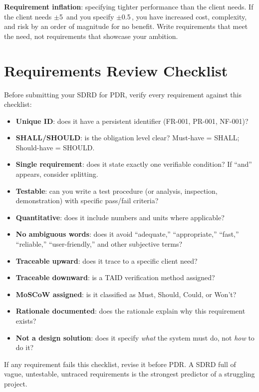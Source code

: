 \textbf{Requirement inflation}: specifying tighter performance than the client needs. If the client needs $\pm$5\,\degC{} and you specify $\pm$0.5\,\degC{}, you have increased cost, complexity, and risk by an order of magnitude for no benefit. Write requirements that meet the need, not requirements that showcase your ambition.

\section{Requirements Review Checklist}
Before submitting your SDRD for PDR, verify every requirement against this checklist:

\begin{itemize}[nosep,leftmargin=1.5em]
\item \textbf{Unique ID}: does it have a persistent identifier (FR-001, PR-001, NF-001)?
\item \textbf{SHALL/SHOULD}: is the obligation level clear? Must-have = SHALL; Should-have = SHOULD.
\item \textbf{Single requirement}: does it state exactly one verifiable condition? If ``and'' appears, consider splitting.
\item \textbf{Testable}: can you write a test procedure (or analysis, inspection, demonstration) with specific pass/fail criteria?
\item \textbf{Quantitative}: does it include numbers and units where applicable?
\item \textbf{No ambiguous words}: does it avoid ``adequate,'' ``appropriate,'' ``fast,'' ``reliable,'' ``user-friendly,'' and other subjective terms?
\item \textbf{Traceable upward}: does it trace to a specific client need?
\item \textbf{Traceable downward}: is a TAID verification method assigned?
\item \textbf{MoSCoW assigned}: is it classified as Must, Should, Could, or Won't?
\item \textbf{Rationale documented}: does the rationale explain why this requirement exists?
\item \textbf{Not a design solution}: does it specify \emph{what} the system must do, not \emph{how} to do it?
\end{itemize}

If any requirement fails this checklist, revise it before PDR. A SDRD full of vague, untestable, untraced requirements is the strongest predictor of a struggling project.

